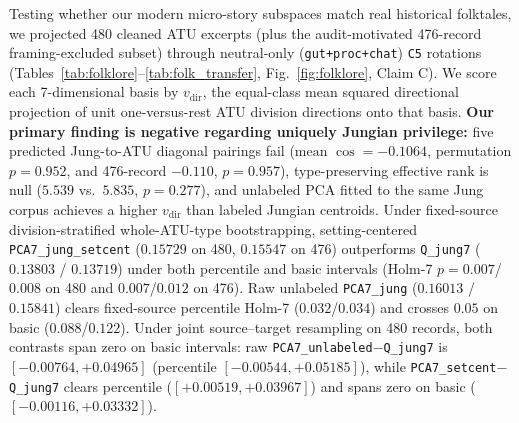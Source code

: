 \documentclass[conference]{IEEEtran}
\begin{document}
Testing whether our modern micro-story subspaces match real historical folktales, we projected 480 cleaned ATU excerpts (plus the audit-motivated 476-record framing-excluded subset) through neutral-only (\texttt{gut+proc+chat}) \texttt{C5} rotations (Tables~\ref{tab:folklore}--\ref{tab:folk_transfer}, Fig.~\ref{fig:folklore}, Claim C). We score each 7-dimensional basis by $v_{\text{dir}}$, the equal-class mean squared directional projection of unit one-versus-rest ATU division directions onto that basis. \textbf{Our primary finding is negative regarding uniquely Jungian privilege:} five predicted Jung-to-ATU diagonal pairings fail ($\text{mean }\cos=-0.1064$, permutation $p=0.952$, and 476-record $-0.110$, $p=0.957$), type-preserving effective rank is null ($5.539$ vs.\ $5.835$, $p=0.277$), and unlabeled PCA fitted to the same Jung corpus achieves a higher $v_{\text{dir}}$ than labeled Jungian centroids. Under fixed-source division-stratified whole-ATU-type bootstrapping, setting-centered \texttt{PCA7\_jung\_setcent} ($0.15729$ on 480, $0.15547$ on 476) outperforms \texttt{Q\_jung7} ($0.13803$ / $0.13719$) under both percentile and basic intervals (Holm-7 $p=0.007$/$0.008$ on 480 and $0.007$/$0.012$ on 476). Raw unlabeled \texttt{PCA7\_jung} ($0.16013$ / $0.15841$) clears fixed-source percentile Holm-7 ($0.032$/$0.034$) and crosses $0.05$ on basic ($0.088$/$0.122$). Under joint source--target resampling on 480 records, both contrasts span zero on basic intervals: raw \texttt{PCA7\_unlabeled}$-$\texttt{Q\_jung7} is $[-0.00764, +0.04965]$ (percentile $[-0.00544, +0.05185]$), while \texttt{PCA7\_setcent}$-$\texttt{Q\_jung7} clears percentile ($[+0.00519, +0.03967]$) and spans zero on basic ($[-0.00116, +0.03332]$).
\end{document}
